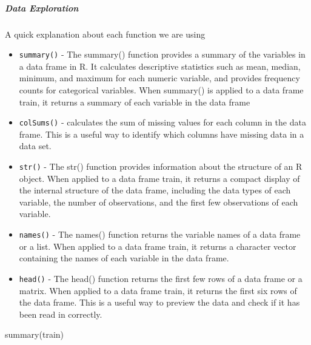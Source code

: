 \documentclass[
]{article}
\newenvironment{Shaded}{\begin{snugshade}}{\end{snugshade}}
\newcommand{\FunctionTok}[1]{\textcolor[rgb]{0.00,0.00,0.00}{#1}}
\newcommand{\NormalTok}[1]{#1}
\providecommand{\tightlist}{%
  \setlength{\itemsep}{0pt}\setlength{\parskip}{0pt}}
\begin{document}
\hypertarget{data-exploration}{%
\subparagraph{Data Exploration}\label{data-exploration}}

A quick explanation about each function we are using

\begin{itemize}
\tightlist
\item
  \texttt{summary()} - The summary() function provides a summary of the
  variables in a data frame in R. It calculates descriptive statistics
  such as mean, median, minimum, and maximum for each numeric variable,
  and provides frequency counts for categorical variables. When
  summary() is applied to a data frame train, it returns a summary of
  each variable in the data frame
\item
  \texttt{colSums()} - calculates the sum of missing values for each
  column in the data frame. This is a useful way to identify which
  columns have missing data in a data set.
\item
  \texttt{str()} - The str() function provides information about the
  structure of an R object. When applied to a data frame train, it
  returns a compact display of the internal structure of the data frame,
  including the data types of each variable, the number of observations,
  and the first few observations of each variable.
\item
  \texttt{names()} - The names() function returns the variable names of
  a data frame or a list. When applied to a data frame train, it returns
  a character vector containing the names of each variable in the data
  frame.
\item
  \texttt{head()} - The head() function returns the first few rows of a
  data frame or a matrix. When applied to a data frame train, it returns
  the first six rows of the data frame. This is a useful way to preview
  the data and check if it has been read in correctly.
\end{itemize}

\begin{Shaded}
\begin{Highlighting}[]
\FunctionTok{summary}\NormalTok{(train)}
\end{Highlighting}
\end{Shaded}
\end{document}
